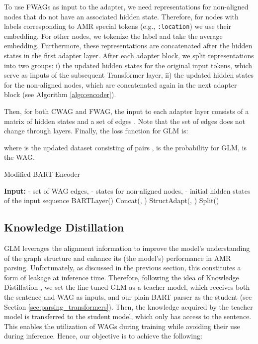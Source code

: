 \documentclass[11pt]{article}
\begin{document}
To use FWAGs as input to the adapter, we need representations for non-aligned nodes that do not have an associated hidden state. Therefore, for nodes with labels corresponding to AMR special tokens (e.g., \texttt{:location}) we use their embedding. For other nodes, we tokenize the label and take the average embedding. Furthermore, these representations are concatenated after the hidden states in the first adapter layer. After each adapter block, we split representations into two groups: i) the updated hidden states for the original input tokens, which serve as inputs of the subsequent Transformer layer, ii) the updated hidden states for the non-aligned nodes, which are concatenated again in the next adapter block (see Algorithm \ref{algo:encoder}). 

Then, for both CWAG and FWAG, the input to each adapter layer  consists of a matrix of hidden states  and a set of edges . 
Note that the set of edges  does not change through layers. Finally, the loss function for GLM is:

where  is the updated dataset consisting of pairs ,  is the probability for GLM,  is the WAG. 

\begin{algorithm}[t]
	\caption{Modified BART Encoder}
	\begin{algorithmic}
            \State \textbf{Input:}  - set of WAG edges,  - states for non-aligned nodes,  - initial hidden states of the input sequence
		\For { }
            \State  BARTLayer()
                    \State  Concat(, )
                \Else
                    \State  
                \EndIf
                \State  StructAdapt(, )
                    \State  Split()
                \Else
                    \State 
                \EndIf
            \Else
                \State 
            \EndIf
            \State  
		\EndFor
	\end{algorithmic} 
 \label{algo:encoder}
\end{algorithm} 


\subsection{Knowledge Distillation}\label{KD_model}

GLM leverages the alignment information to improve the model's understanding of the graph structure and enhance its (the model's) performance in AMR parsing. Unfortunately, as discussed in the previous section, this constitutes a form of leakage at inference time. Therefore, following the idea of Knowledge Distillation \cite[KD]{Hinton2015DistillingTK}, we set the fine-tuned GLM as a teacher model, which receives both the sentence and WAG as inputs, and our plain BART parser as the student (see Section \ref{sec:parsing_transformers}).
Then, the knowledge acquired by the teacher model is  transferred to the student model, which only has access to the sentence. This enables the utilization of WAGs during training while avoiding their use during inference. Hence, our objective is to achieve the following:
\end{document}
